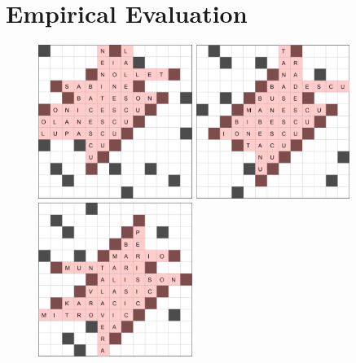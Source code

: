 \section{Empirical Evaluation}


\begin{figure}[th]
\centering






\includegraphics[height=5cm]{_empiricalSupport/_originalSubmission/y-2013/results/_runWombat/2013a.png}
%
\hspace{1cm}
%
\includegraphics[height=5cm]{_empiricalSupport/_originalSubmission/y-2021/results/_runWombat/2021a.png}
%
\hspace{1cm}
%
\includegraphics[height=5cm]{_empiricalSupport/_originalSubmission/y-2023/results/_runWombat/2023a.png}


\end{figure}
